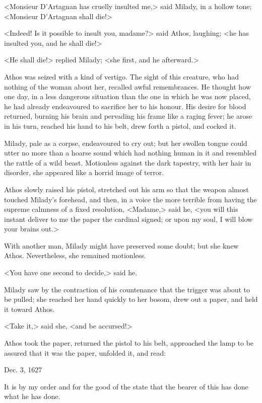 <Monsieur D'Artagnan has cruelly insulted me,> said Milady, in a hollow tone; <Monsieur D'Artagnan shall die!> 

<Indeed! Is it possible to insult you, madame?> said Athos, laughing; <he has insulted you, and he shall die!> 

<He shall die!> replied Milady; <she first, and he afterward.> 

Athos was seized with a kind of vertigo. The sight of this creature, who had nothing of the woman about her, recalled awful remembrances. He thought how one day, in a less dangerous situation than the one in which he was now placed, he had already endeavoured to sacrifice her to his honour. His desire for blood returned, burning his brain and pervading his frame like a raging fever; he arose in his turn, reached his hand to his belt, drew forth a pistol, and cocked it. 

Milady, pale as a corpse, endeavoured to cry out; but her swollen tongue could utter no more than a hoarse sound which had nothing human in it and resembled the rattle of a wild beast. Motionless against the dark tapestry, with her hair in disorder, she appeared like a horrid image of terror. 

Athos slowly raised his pistol, stretched out his arm so that the weapon almost touched Milady's forehead, and then, in a voice the more terrible from having the supreme calmness of a fixed resolution, <Madame,> said he, <you will this instant deliver to me the paper the cardinal signed; or upon my soul, I will blow your brains out.> 

With another man, Milady might have preserved some doubt; but she knew Athos. Nevertheless, she remained motionless. 

<You have one second to decide,> said he. 

Milady saw by the contraction of his countenance that the trigger was about to be pulled; she reached her hand quickly to her bosom, drew out a paper, and held it toward Athos. 

<Take it,> said she, <and be accursed!> 

Athos took the paper, returned the pistol to his belt, approached the lamp to be assured that it was the paper, unfolded it, and read: 

\begin{mail}{Dec. 3, 1627}

It is by my order and for the good of the state that the bearer of this has done what he has done.

\end{mail}

